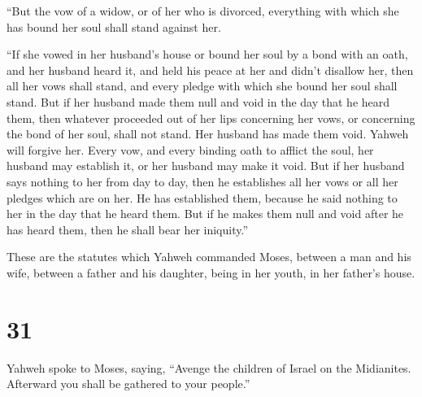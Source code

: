  ``But the vow of a widow, or of her who is divorced,
everything with which she has bound her soul shall stand against her.

 ``If she vowed in her husband's house or bound her soul by
a bond with an oath,  and her husband heard it, and held
his peace at her and didn't disallow her, then all her vows shall stand,
and every pledge with which she bound her soul shall stand.
 But if her husband made them null and void in the day that
he heard them, then whatever proceeded out of her lips concerning her
vows, or concerning the bond of her soul, shall not stand. Her husband
has made them void. Yahweh will forgive her.  Every vow,
and every binding oath to afflict the soul, her husband may establish
it, or her husband may make it void.  But if her husband
says nothing to her from day to day, then he establishes all her vows or
all her pledges which are on her. He has established them, because he
said nothing to her in the day that he heard them.  But if
he makes them null and void after he has heard them, then he shall bear
her iniquity.''

 These are the statutes which Yahweh commanded Moses,
between a man and his wife, between a father and his daughter, being in
her youth, in her father's house.

\hypertarget{section-30}{%
\section{31}\label{section-30}}

 Yahweh spoke to Moses, saying,  ``Avenge the
children of Israel on the Midianites. Afterward you shall be gathered to
your people.''

